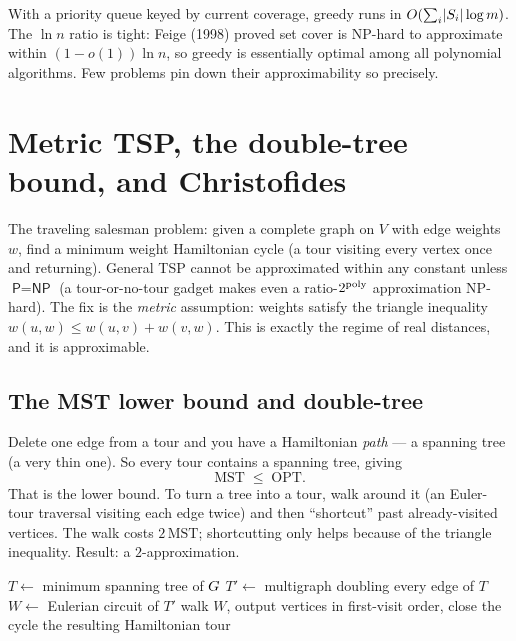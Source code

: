\begin{complexitybox}
With a priority queue keyed by current coverage, greedy runs in $O\!\left(\sum_i \lvert S_i\rvert\log m\right)$.
The $\ln n$ ratio is tight: Feige (1998) proved set cover is \textsf{NP}-hard to approximate within
$(1-o(1))\ln n$, so greedy is essentially optimal among all polynomial algorithms. Few problems pin
down their approximability so precisely.
\end{complexitybox}

\section{Metric TSP, the double-tree bound, and Christofides}

The traveling salesman problem: given a complete graph on $V$ with edge weights $w$, find a minimum
weight Hamiltonian cycle (a tour visiting every vertex once and returning). General TSP cannot be
approximated within any constant unless $\textsf{P}=\textsf{NP}$ (a tour-or-no-tour gadget makes even
a ratio-$2^{\operatorname{poly}}$ approximation \textsf{NP}-hard). The fix is the \emph{metric} assumption: weights
satisfy the triangle inequality $w(u,w)\le w(u,v)+w(v,w)$. This is exactly the regime of real
distances, and it is approximable.

\subsection{The MST lower bound and double-tree}

\begin{intuitionbox}
Delete one edge from a tour and you have a Hamiltonian \emph{path} --- a spanning tree (a very thin
one). So every tour contains a spanning tree, giving
\[
  \mathrm{MST} \;\le\; \mathrm{OPT}.
\]
That is the lower bound. To turn a tree into a tour, walk around it (an Euler-tour traversal visiting
each edge twice) and then ``shortcut'' past already-visited vertices. The walk costs $2\,\mathrm{MST}$;
shortcutting only helps because of the triangle inequality. Result: a $2$-approximation.
\end{intuitionbox}

\begin{algorithm}[H]
\caption{\textsc{DoubleTreeTSP}$(\Gph,w)$ -- metric}\label{ch38:alg-doubletree}
\DontPrintSemicolon
$T \gets$ minimum spanning tree of $G$\;
$T' \gets$ multigraph doubling every edge of $T$ 
$W \gets$ Eulerian circuit of $T'$ 
walk $W$, output vertices in first-visit order, close the cycle\;
\Return the resulting Hamiltonian tour\;
\end{algorithm}

